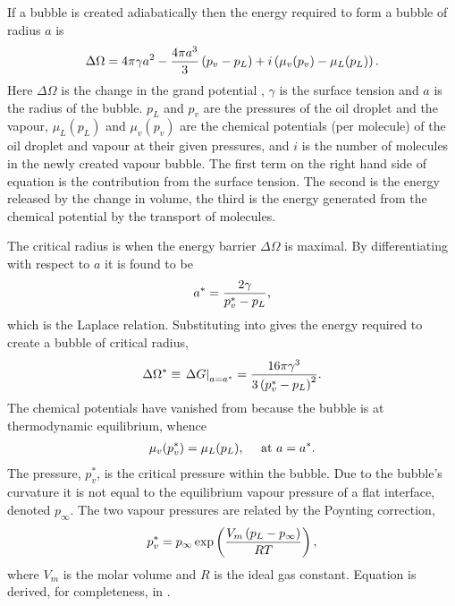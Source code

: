 If a bubble is created adiabatically then the energy required to form a bubble of radius $a$ is  \cite{Delale2003, Katz1973}
\begin{align}
  \Delta \Omega =4\pi \gamma  a^2 - \frac{4\pi a^3}{3}\left( p_v - p_L \right) + i\left( \mu_v(p_v) - \mu_L(p_L) \right).\label{eqn:DeltaG}
\end{align}
Here $\Delta \Omega$ is the change in the grand potential , $\gamma$ is the surface tension and $a$ is the radius of the bubble.
$p_L$ and $p_v$ are the pressures of the oil droplet and the vapour,
 $\mu_L(p_L)$ and $\mu_v(p_v)$ are the chemical potentials (per molecule) of the oil droplet and vapour
at their given pressures,
and $i$ is the number of molecules in the newly created vapour bubble.
The first term on the right hand side of equation  is the contribution from the surface tension.
The second is the energy released by the change in volume,
the third is the energy generated from  the chemical potential by the transport of molecules.



The critical radius is  when the energy  barrier $\Delta \Omega$ is maximal.
By differentiating  with respect to $a$ it is found to be
\begin{align}
  {a^\ast} = \frac{2\gamma}{p_v^\ast-p_L}, \label{eqn:LaplaceRelation}
\end{align}
which is the Laplace relation.
Substituting  into  gives the energy required to create a bubble of  critical radius,
\begin{align}
   \Delta \Omega^\ast \equiv \left.{\Delta G}\right|_{a = {a^\ast}} = \frac{16\pi\gamma^3}{3\left( p_v^\ast- p_L \right)^2}.\label{eqn:DeltaGStar}
\end{align}
The chemical potentials have vanished from  because  the bubble is at thermodynamic equilibrium, whence
\begin{align}
  \mu_v(p_v^\ast) = \mu_L(p_L),\label{eqn:thermoEqlbm} \quad\text{ at $a = {a^\ast}$.}
\end{align} 
The pressure, $p_v^\ast$, is the critical pressure within the bubble.
Due to the bubble's curvature  it is not equal to the equilibrium vapour pressure of a flat interface, 
denoted $p_\infty$. %
The two vapour pressures are related by the Poynting correction, 
\begin{align}
  p_v^\ast = p_\infty \exp \left(  \frac{V_m\left( p_L -p_\infty \right) }{R T}   \right),\label{eqn:PoyntingCorrection}
\end{align}
where $V_m$ is the molar volume  and $R$ is the ideal gas constant.
Equation  is derived, for completeness, in  .



